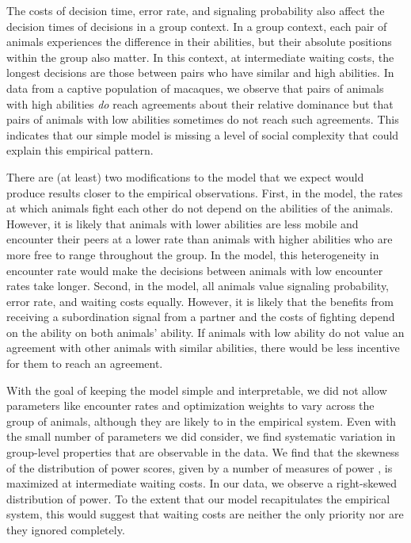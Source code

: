 \documentclass{article}
\begin{document}
The costs of decision time, error rate, and signaling probability also affect the decision times of decisions in a group context.  In a group context, each pair of animals experiences the difference in their abilities, but their absolute positions within the group also matter.  In this context, at intermediate waiting costs, the longest decisions are those between pairs who have similar and high abilities.  In data from a captive population of macaques, we observe that pairs of animals with high abilities \emph{do} reach agreements about their relative dominance but that pairs of animals with low abilities sometimes do not reach such agreements.  This indicates that our simple model is missing a level of social complexity that could explain this empirical pattern.  

There are (at least) two modifications to the model that we expect would produce results closer to the empirical observations.  First, in the model, the rates at which animals fight each other do not depend on the abilities of the animals.  However, it is likely that animals with lower abilities are less mobile and encounter their peers at a lower rate than animals with higher abilities who are more free to range throughout the group.  In the model, this heterogeneity in encounter rate would make the decisions between animals with low encounter rates take longer.  Second, in the model, all animals value signaling probability, error rate, and waiting costs equally.  However, it is likely that the benefits from receiving a subordination signal from a partner and the costs of fighting depend on the ability on both animals' ability.  If animals with low ability  do not value an agreement with other animals with similar abilities, there would be less incentive for them to reach an agreement.  

With the goal of keeping the model simple and interpretable, we did not allow parameters like encounter rates and optimization weights to vary across the group of animals, although they are likely to in the empirical system.  Even with the small number of parameters we did consider, we find systematic variation in group-level properties that are observable in the data.  We find that the skewness of the distribution of power scores, given by a number of measures of power \cite{Brush:2013fk,Flack:2006uq}, is maximized at intermediate waiting costs.  In our data, we observe a right-skewed distribution of power.  To the extent that our model recapitulates the empirical system, this would suggest that waiting costs are neither the only priority nor are they ignored completely.
\end{document}
